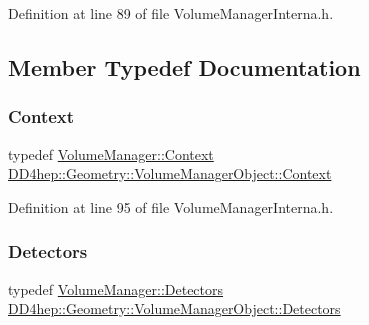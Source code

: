 Definition at line 89 of file Volume\+Manager\+Interna.\+h.



\subsection{Member Typedef Documentation}
\hypertarget{class_d_d4hep_1_1_geometry_1_1_volume_manager_object_ac975f498c99a0933b0b5911d4fb721b3}{}\label{class_d_d4hep_1_1_geometry_1_1_volume_manager_object_ac975f498c99a0933b0b5911d4fb721b3} 
\subsubsection{\texorpdfstring{Context}{Context}}
{\footnotesize\ttfamily typedef \hyperlink{class_d_d4hep_1_1_geometry_1_1_volume_manager_adadb14f2ccbeaad001b7bc6ddb6dc715}{Volume\+Manager\+::\+Context} \hyperlink{class_d_d4hep_1_1_geometry_1_1_volume_manager_object_ac975f498c99a0933b0b5911d4fb721b3}{D\+D4hep\+::\+Geometry\+::\+Volume\+Manager\+Object\+::\+Context}}



Definition at line 95 of file Volume\+Manager\+Interna.\+h.

\hypertarget{class_d_d4hep_1_1_geometry_1_1_volume_manager_object_a3148ed79d5f6e5175060519838dbad38}{}\label{class_d_d4hep_1_1_geometry_1_1_volume_manager_object_a3148ed79d5f6e5175060519838dbad38} 
\subsubsection{\texorpdfstring{Detectors}{Detectors}}
{\footnotesize\ttfamily typedef \hyperlink{class_d_d4hep_1_1_geometry_1_1_volume_manager_a89d31fb00522aa56dfa2708fedaf1e4f}{Volume\+Manager\+::\+Detectors} \hyperlink{class_d_d4hep_1_1_geometry_1_1_volume_manager_object_a3148ed79d5f6e5175060519838dbad38}{D\+D4hep\+::\+Geometry\+::\+Volume\+Manager\+Object\+::\+Detectors}}




